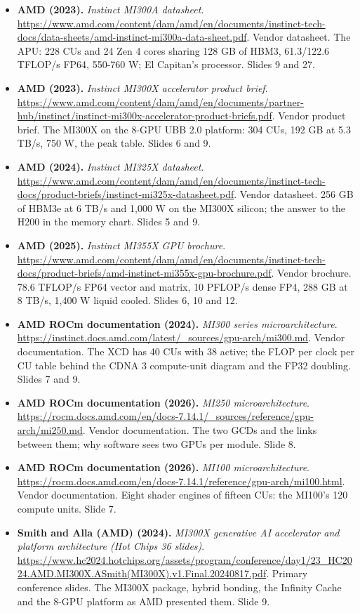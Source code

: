 \begin{itemize}[leftmargin=1.2em,itemsep=3pt]
\item \textbf{AMD (2023).} \textit{Instinct MI300A datasheet}. \url{https://www.amd.com/content/dam/amd/en/documents/instinct-tech-docs/data-sheets/amd-instinct-mi300a-data-sheet.pdf}. Vendor datasheet. The APU: 228 CUs and 24 Zen 4 cores sharing 128 GB of HBM3, 61.3/122.6 TFLOP/s FP64, 550-760 W; El Capitan's processor. Slides 9 and 27.
\item \textbf{AMD (2023).} \textit{Instinct MI300X accelerator product brief}. \url{https://www.amd.com/content/dam/amd/en/documents/partner-hub/instinct/instinct-mi300x-accelerator-product-briefs.pdf}. Vendor product brief. The MI300X on the 8-GPU UBB 2.0 platform: 304 CUs, 192 GB at 5.3 TB/s, 750 W, the peak table. Slides 6 and 9.
\item \textbf{AMD (2024).} \textit{Instinct MI325X datasheet}. \url{https://www.amd.com/content/dam/amd/en/documents/instinct-tech-docs/product-briefs/instinct-mi325x-datasheet.pdf}. Vendor datasheet. 256 GB of HBM3e at 6 TB/s and 1,000 W on the MI300X silicon; the answer to the H200 in the memory chart. Slides 5 and 9.
\item \textbf{AMD (2025).} \textit{Instinct MI355X GPU brochure}. \url{https://www.amd.com/content/dam/amd/en/documents/instinct-tech-docs/product-briefs/amd-instinct-mi355x-gpu-brochure.pdf}. Vendor brochure. 78.6 TFLOP/s FP64 vector and matrix, 10 PFLOP/s dense FP4, 288 GB at 8 TB/s, 1,400 W liquid cooled. Slides 6, 10 and 12.
\item \textbf{AMD ROCm documentation (2024).} \textit{MI300 series microarchitecture}. \url{https://instinct.docs.amd.com/latest/_sources/gpu-arch/mi300.md}. Vendor documentation. The XCD has 40 CUs with 38 active; the FLOP per clock per CU table behind the CDNA 3 compute-unit diagram and the FP32 doubling. Slides 7 and 9.
\item \textbf{AMD ROCm documentation (2026).} \textit{MI250 microarchitecture}. \url{https://rocm.docs.amd.com/en/docs-7.14.1/_sources/reference/gpu-arch/mi250.md}. Vendor documentation. The two GCDs and the links between them; why software sees two GPUs per module. Slide 8.
\item \textbf{AMD ROCm documentation (2026).} \textit{MI100 microarchitecture}. \url{https://rocm.docs.amd.com/en/docs-7.14.1/reference/gpu-arch/mi100.html}. Vendor documentation. Eight shader engines of fifteen CUs: the MI100's 120 compute units. Slide 7.
\item \textbf{Smith and Alla (AMD) (2024).} \textit{MI300X generative AI accelerator and platform architecture (Hot Chips 36 slides)}. \url{https://www.hc2024.hotchips.org/assets/program/conference/day1/23_HC2024.AMD.MI300X.ASmith(MI300X).v1.Final.20240817.pdf}. Primary conference slides. The MI300X package, hybrid bonding, the Infinity Cache and the 8-GPU platform as AMD presented them. Slide 9.

\end{itemize}
